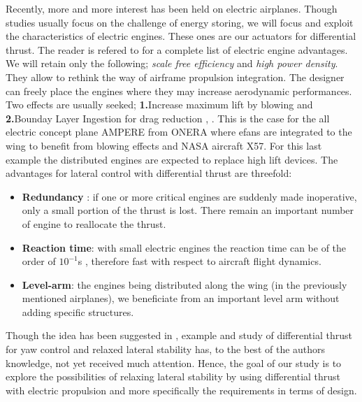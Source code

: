 Recently, more and more interest has been held on electric airplanes. Though studies usually focus on the challenge of energy storing, we will focus and exploit the characteristics of electric engines. These ones are our actuators for differential thrust. The reader is refered to \cite{MisconceptionMoore} for a complete list of electric engine advantages. We will retain only the following; \emph{scale free efficiency} and \emph{high power density}. They allow to rethink the way of airframe propulsion integration. The designer can freely place the engines where they may increase aerodynamic performances. Two effects are usually seeked; \textbf{1.}Increase maximum lift by blowing and \textbf{2.}Bounday Layer Ingestion for drag reduction \cite{Assessment_of_DEP}, \cite{Turboelec_prop_analysis_nasa}. This is the case for the all electric concept plane AMPERE from ONERA \cite{Ampere_concept} where efans are integrated to the wing to benefit from blowing effects and NASA aircraft X57\cite{DesignPerfSceptor}. For this last example the distributed engines are expected to replace high lift devices.
The advantages for lateral control with differential thrust are threefold:
\begin{itemize}
	\item \textbf{Redundancy} : if one or more critical engines are suddenly made inoperative, only a small portion of the thrust is lost. There remain an important number of engine to reallocate the thrust.
	\item \textbf{Reaction time}: with small electric engines the reaction time can be of the order of $10^{-1}$s \cite{ActionneurElectric}, therefore fast with respect to aircraft flight dynamics.
	\item \textbf{Level-arm}: the engines being distributed along the wing (in the previously mentioned airplanes), we beneficiate from an important level arm without adding specific structures.
\end{itemize}


Though the idea has been suggested in \cite{Turboelec_prop_analysis_nasa}, example and study of differential thrust for yaw control and relaxed lateral stability has, to the best of the authors knowledge, not yet received much attention. Hence, the goal of our study is to explore the possibilities of relaxing lateral stability by using differential thrust with electric propulsion and more specifically the requirements in terms of design.


